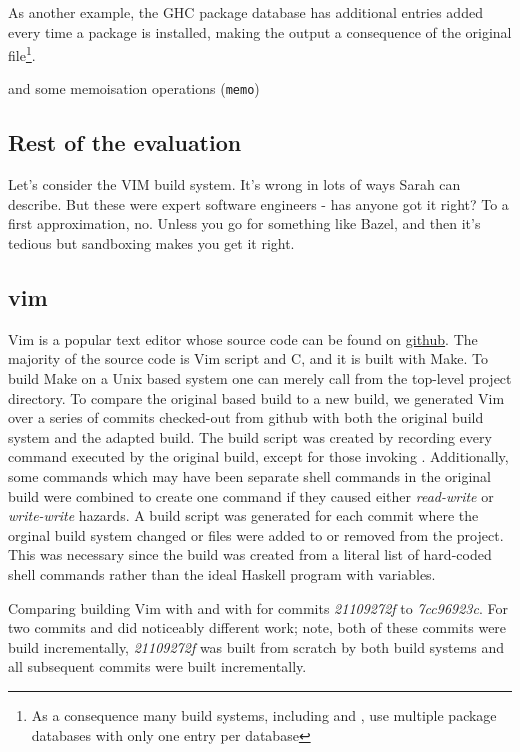 As another example, the GHC package database has additional entries added every time a package is installed, making the output a consequence of the original file\footnote{As a consequence many build systems, including \Bazel and \Rattle, use multiple package databases with only one entry per database}.

and some memoisation operations (\texttt{memo})

\subsection{Rest of the evaluation}

Let's consider the VIM build system. It's wrong in lots of ways Sarah can describe. But these were expert software engineers - has anyone got it right? To a first approximation, no. Unless you go for something like Bazel, and then it's tedious but sandboxing makes you get it right.


\subsection{vim}

Vim is a popular text editor whose source code can be found on \href{https://github.com/vim/vim}{github}.  The majority of the source code is Vim script and C, and it is built with Make.  To build Make on a Unix based system one can merely call \Make from the top-level project directory.  To compare the original \Make based build to a new \Rattle build, we generated Vim over a series of commits checked-out from github with both the original build system and the adapted \Rattle build.  The \Rattle build script was created by recording every command executed by the original build, except for those invoking \Make.  Additionally, some commands which may have been separate shell commands in the original build were combined to create one command if they caused either \emph{read-write} or \emph{write-write} hazards.  A \Rattle build script was generated for each commit where the orginal build system changed or files were added to or removed from the project.  This was necessary since the \Rattle build was created from a literal list of hard-coded shell commands rather than the ideal Haskell program with variables.


Comparing building Vim \cite{} with \Make and with \Rattle for commits \emph{21109272f} to \emph{7cc96923c}.  For two commits \Make and \Rattle did noticeably different work; note, both of these commits were build incrementally, \emph{21109272f} was built from scratch by both build systems and all subsequent commits were built incrementally.

